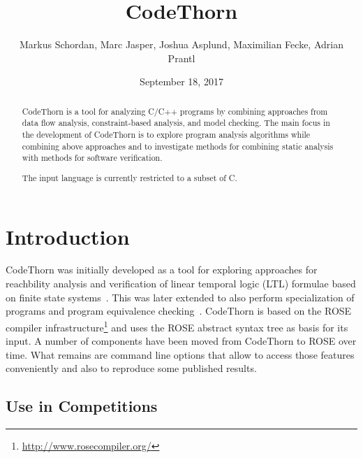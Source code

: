 \documentclass[natbib]{article}
\begin{document}
\title{CodeThorn}

\author{\small Markus Schordan, Marc Jasper, Joshua Asplund, Maximilian Fecke, Adrian Prantl}
\date{September 18, 2017}

\maketitle

\begin{abstract}
\noindent CodeThorn is a tool for analyzing C/C++ programs by combining approaches
from data flow analysis, constraint-based analysis, and model
checking. The main focus in the development of CodeThorn is to explore program analysis algorithms while combining above
approaches and to investigate methods for combining static analysis with
methods for software verification.

The input language is currently restricted to a subset of C.

\end{abstract}

\tableofcontents


\section{Introduction}
\label{sec:intro}

CodeThorn was initially developed as a tool for exploring approaches
for reachbility analysis and verification of linear temporal logic (LTL)
formulae based on finite state systems~\cite{schordan2014combining}. 
This was later extended to
also perform specialization of programs and program equivalence
checking~\cite{schordan2014verification}. CodeThorn is based on the 
ROSE compiler infrastructure\footnote{\url{http://www.rosecompiler.org/}} 
and uses the ROSE abstract syntax tree as basis for its input. 
A number of components have been moved
from CodeThorn to ROSE over time. What remains are command line
options that allow to access those features conveniently and also to
reproduce some published results.

\nocite{roseWWW}

\subsection{Use in Competitions}
\end{document}
